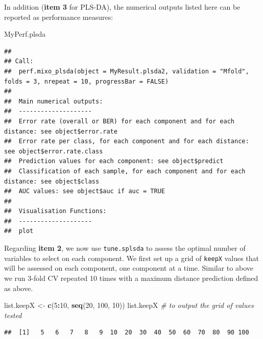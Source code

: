 \documentclass[]{book}
\newenvironment{Shaded}{\begin{snugshade}}{\end{snugshade}}
\newcommand{\CommentTok}[1]{\textcolor[rgb]{0.56,0.35,0.01}{\textit{#1}}}
\newcommand{\DecValTok}[1]{\textcolor[rgb]{0.00,0.00,0.81}{#1}}
\newcommand{\KeywordTok}[1]{\textcolor[rgb]{0.13,0.29,0.53}{\textbf{#1}}}
\newcommand{\NormalTok}[1]{#1}
\newcommand{\OperatorTok}[1]{\textcolor[rgb]{0.81,0.36,0.00}{\textbf{#1}}}
\newcommand{\StringTok}[1]{\textcolor[rgb]{0.31,0.60,0.02}{#1}}
\begin{document}
In addition (\textbf{item 3} for PLS-DA), the numerical outputs listed here can be reported as performance measures:

\begin{Shaded}
\begin{Highlighting}[]
\NormalTok{MyPerf.plsda}
\end{Highlighting}
\end{Shaded}

\begin{verbatim}
## 
## Call:
##  perf.mixo_plsda(object = MyResult.plsda2, validation = "Mfold", folds = 3, nrepeat = 10, progressBar = FALSE) 
## 
##  Main numerical outputs: 
##  -------------------- 
##  Error rate (overall or BER) for each component and for each distance: see object$error.rate 
##  Error rate per class, for each component and for each distance: see object$error.rate.class 
##  Prediction values for each component: see object$predict 
##  Classification of each sample, for each component and for each distance: see object$class 
##  AUC values: see object$auc if auc = TRUE 
## 
##  Visualisation Functions: 
##  -------------------- 
##  plot
\end{verbatim}

Regarding \textbf{item 2}, we now use \texttt{tune.splsda} to assess the optimal number of variables to select on each component. We first set up a grid of \texttt{keepX} values that will be assessed on each component, one component at a time.
Similar to above we run 3-fold CV repeated 10 times with a maximum distance prediction defined as above.

\begin{Shaded}
\begin{Highlighting}[]
\NormalTok{list.keepX <-}\StringTok{ }\KeywordTok{c}\NormalTok{(}\DecValTok{5}\OperatorTok{:}\DecValTok{10}\NormalTok{,  }\KeywordTok{seq}\NormalTok{(}\DecValTok{20}\NormalTok{, }\DecValTok{100}\NormalTok{, }\DecValTok{10}\NormalTok{))}
\NormalTok{list.keepX }\CommentTok{# to output the grid of values tested}
\end{Highlighting}
\end{Shaded}

\begin{verbatim}
##  [1]   5   6   7   8   9  10  20  30  40  50  60  70  80  90 100
\end{verbatim}
\end{document}
